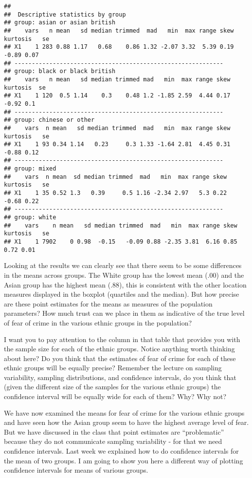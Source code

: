 \documentclass[
]{book}
\begin{document}
\begin{verbatim}
## 
##  Descriptive statistics by group 
## group: asian or asian british
##    vars   n mean   sd median trimmed  mad   min  max range skew kurtosis   se
## X1    1 283 0.88 1.17   0.68    0.86 1.32 -2.07 3.32  5.39 0.19    -0.89 0.07
## ------------------------------------------------------------ 
## group: black or black british
##    vars   n mean   sd median trimmed mad   min  max range skew kurtosis  se
## X1    1 120  0.5 1.14    0.3    0.48 1.2 -1.85 2.59  4.44 0.17    -0.92 0.1
## ------------------------------------------------------------ 
## group: chinese or other
##    vars  n mean   sd median trimmed  mad   min  max range skew kurtosis   se
## X1    1 93 0.34 1.14   0.23     0.3 1.33 -1.64 2.81  4.45 0.31    -0.88 0.12
## ------------------------------------------------------------ 
## group: mixed
##    vars  n mean  sd median trimmed  mad   min  max range skew kurtosis   se
## X1    1 35 0.52 1.3   0.39     0.5 1.16 -2.34 2.97   5.3 0.22    -0.68 0.22
## ------------------------------------------------------------ 
## group: white
##    vars    n mean   sd median trimmed  mad   min  max range skew kurtosis   se
## X1    1 7902    0 0.98  -0.15   -0.09 0.88 -2.35 3.81  6.16 0.85     0.72 0.01
\end{verbatim}

Looking at the results we can clearly see that there seem to be some differences in the means across groups. The White group has the lowest mean (.00) and the Asian group has the highest mean (.88), this is consistent with the other location measures displayed in the boxplot (quartiles and the median). But how precise are these point estimates for the means as measures of the population parameters? How much trust can we place in them as indicative of the true level of fear of crime in the various ethnic groups in the population?

I want you to pay attention to the column in that table that provides you with the sample size for each of the ethnic groups. Notice anything worth thinking about here? Do you think that the estimates of fear of crime for each of these ethnic groups will be equally precise? Remember the lecture on sampling variability, sampling distributions, and confidence intervals, do you think that (given the different size of the samples for the various ethnic groups) the confidence interval will be equally wide for each of them? Why? Why not?

We have now examined the means for fear of crime for the various ethnic groups and have seen how the Asian group seem to have the highest average level of fear. But we have discussed in the class that point estimates are ``problematic'' because they do not communicate sampling variability - for that we need confidence intervals. Last week we explained how to do confidence intervals for the mean of two groups. I am going to show you here a different way of plotting confidence intervals for means of various groups.
\end{document}
